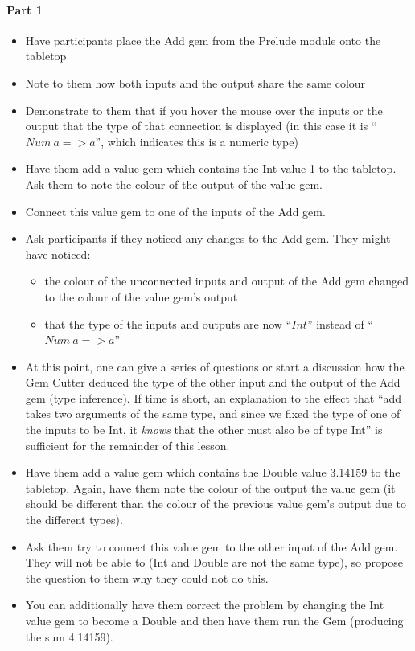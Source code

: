 	{
		\paragraph{Part 1}
		
		\begin{itemize}
			\item Have participants place the Add gem from the Prelude module onto the tabletop
			\item Note to them how both inputs and the output share the same colour
			\item Demonstrate to them that if you hover the mouse over the inputs or the output that the type of that connection is displayed (in this case it is ``\(Num\: a => a\)'', which indicates this is a numeric type)
			\item Have them add a value gem which contains the Int value 1 to the tabletop.  Ask them to note the colour of the output of the value gem.
			\item Connect this value gem to one of the inputs of the Add gem.
			\item Ask participants if they noticed any changes to the Add gem.  They might have noticed:
			\begin{itemize}
				\item the colour of the unconnected inputs and output of the Add gem changed to the colour of the value gem's output
				\item that the type of the inputs and outputs are now ``\(Int\)'' instead of ``\(Num\:a => a\)''
			\end{itemize}
			\item At this point, one can give a series of questions or start a discussion how the Gem Cutter deduced the type of the other input and the output of the Add gem (type inference).  If time is short, an explanation to the effect that ``add takes two arguments of the same type, and since we fixed the type of one of the inputs to be Int, it \emph{knows} that the other must also be of type Int'' is sufficient for the remainder of this lesson.
			\item Have them add a value gem which contains the Double value 3.14159 to the tabletop.  Again, have them note the colour of the output the value gem (it should be different than the colour of the previous value gem's output due to the different types).
			\item Ask them try to connect this value gem to the other input of the Add gem.  They will not be able to (Int and Double are not the same type), so propose the question to them why they could not do this.
			\item You can additionally have them correct the problem by changing the Int value gem to become a Double and then have them run the Gem (producing the sum 4.14159).
		\end{itemize}
		
}
